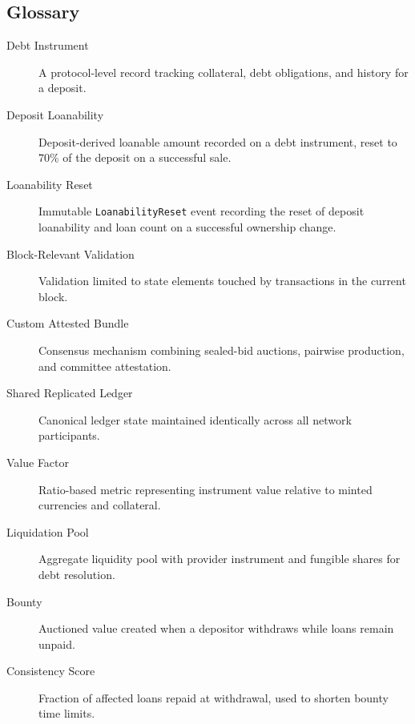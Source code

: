 \documentclass[11pt,a4paper]{article}
\begin{document}
\subsection{Glossary}
\begin{description}
\item[Debt Instrument] A protocol-level record tracking collateral, debt obligations, and history for a deposit.
\item[Deposit Loanability] Deposit-derived loanable amount recorded on a debt instrument, reset to $70\%$ of the deposit on a successful sale.
\item[Loanability Reset] Immutable \texttt{LoanabilityReset} event recording the reset of deposit loanability and loan count on a successful ownership change.
\item[Block-Relevant Validation] Validation limited to state elements touched by transactions in the current block.
\item[Custom Attested Bundle] Consensus mechanism combining sealed-bid auctions, pairwise production, and committee attestation.
\item[Shared Replicated Ledger] Canonical ledger state maintained identically across all network participants.
\item[Value Factor] Ratio-based metric representing instrument value relative to minted currencies and collateral.
\item[Liquidation Pool] Aggregate liquidity pool with provider instrument and fungible shares for debt resolution.
\item[Bounty] Auctioned value created when a depositor withdraws while loans remain unpaid.
\item[Consistency Score] Fraction of affected loans repaid at withdrawal, used to shorten bounty time limits.
\end{description}
\end{document}

